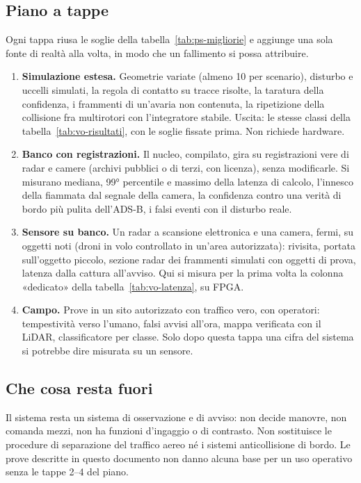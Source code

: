\subsection{Piano a tappe}\label{sec:ps-piano}

Ogni tappa riusa le soglie della tabella~\ref{tab:ps-migliorie} e aggiunge una sola fonte di realtà alla volta, in modo che un fallimento si possa attribuire.
\begin{enumerate}[label=\arabic*.]
\item \textbf{Simulazione estesa.} Geometrie variate (almeno 10 per scenario), disturbo e uccelli simulati, la regola di contatto su tracce risolte, la taratura della confidenza, i frammenti di un'avaria non contenuta, la ripetizione della collisione fra multirotori con l'integratore stabile. Uscita: le stesse classi della tabella~\ref{tab:vo-risultati}, con le soglie fissate prima. Non richiede hardware.
\item \textbf{Banco con registrazioni.} Il nucleo, compilato, gira su registrazioni vere di radar e camere (archivi pubblici o di terzi, con licenza), senza modificarle. Si misurano mediana, 99° percentile e massimo della latenza di calcolo, l'innesco della fiammata dal segnale della camera, la confidenza contro una verità di bordo più pulita dell'ADS-B, i falsi eventi con il disturbo reale.
\item \textbf{Sensore su banco.} Un radar a scansione elettronica e una camera, fermi, su oggetti noti (droni in volo controllato in un'area autorizzata): rivisita, portata sull'oggetto piccolo, sezione radar dei frammenti simulati con oggetti di prova, latenza dalla cattura all'avviso. Qui si misura per la prima volta la colonna «dedicato» della tabella~\ref{tab:vo-latenza}, su FPGA.
\item \textbf{Campo.} Prove in un sito autorizzato con traffico vero, con operatori: tempestività verso l'umano, falsi avvisi all'ora, mappa verificata con il LiDAR, classificatore per classe. Solo dopo questa tappa una cifra del sistema si potrebbe dire misurata su un sensore.
\end{enumerate}

\subsection{Che cosa resta fuori}\label{sec:ps-fuori}

Il sistema resta un sistema di osservazione e di avviso: non decide manovre, non comanda mezzi, non ha funzioni d'ingaggio o di contrasto. Non sostituisce le procedure di separazione del traffico aereo né i sistemi anticollisione di bordo. Le prove descritte in questo documento non danno alcuna base per un uso operativo senza le tappe 2--4 del piano.
